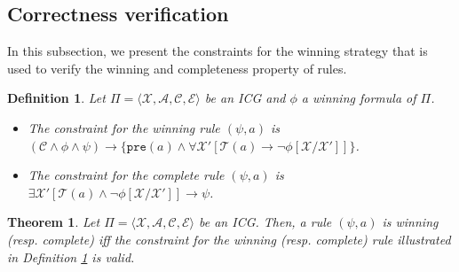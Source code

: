 \documentclass[review]{elsarticle}
\newcommand{\tuple}[1]{\langle {#1} \rangle}
\newcommand{\statevar}{\mathcal{X}}
\newcommand{\act}{\mathcal{A}}
\newcommand{\trans}{\mathcal{T}}
\newcommand{\constraint}{\mathcal{C}}
\newcommand{\estate}{\mathcal{E}}
\newcommand{\pre}{\mathtt{pre}}
\newtheorem{definition}{Definition}
\newtheorem{theorem}{Theorem}
\begin{document}
\subsection{Correctness verification} \label{sec:winStrCorVer}
In this subsection, we present the constraints for the winning strategy that is used to verify the winning and completeness property of rules.

\begin{definition} \label{def:consWinRule} \rm
	Let $\Pi = \tuple{\statevar, \act, \constraint, \estate}$ be an ICG and $\phi$ a winning formula of $\Pi$.
	\begin{itemize}
		\item The constraint for the winning rule $(\psi, a)$ is $(\constraint \land \phi \land \psi) \rightarrow \{\pre(a) \land \forall \statevar' [\trans(a) \rightarrow \neg \phi[\statevar/\statevar']]\}$.
		
		\item The constraint for the complete rule $(\psi, a)$ is $\exists \statevar' [\trans(a) \land \neg \phi[\statevar/\statevar']] \rightarrow \psi$.
	\end{itemize}		
\end{definition}

\begin{theorem} \label{thm:consWinRule} 
	Let $\Pi = \tuple{\statevar, \act, \constraint, \estate}$ be an ICG.
	Then, a rule $(\psi, a)$ is winning (resp. complete) iff the constraint for the winning (resp. complete) rule illustrated in Definition \ref{def:consWinRule} is valid.
\end{theorem}
\end{document}
